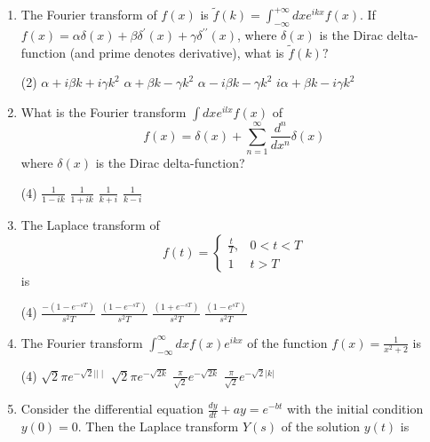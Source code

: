 \begin{enumerate}[label=\color{ocre}\textbf{\arabic*.}]
	\item  The Fourier transform of $f(x)$ is $\tilde{f}(k)=\int_{-\infty}^{+\infty} d x e^{i k x} f(x)$.
	If $f(x)=\alpha \delta(x)+\beta \delta^{\prime}(x)+\gamma \delta^{\prime \prime}(x)$, where $\delta(x)$ is the Dirac delta-function (and prime denotes derivative), what is $\tilde{f}(k) ?$
	{}
	\begin{tasks}(2)
		\task[\textbf{A.}] $\alpha+i \beta k+i \gamma k^{2}$
		\task[\textbf{B.}] $\alpha+\beta k-\gamma k^{2}$
		\task[\textbf{C.}]  $\alpha-i \beta k-\gamma k^{2}$
		\task[\textbf{D.}] $i \alpha+\beta k-i \gamma k^{2}$
	\end{tasks}
	\item  What is the Fourier transform $\int d x e^{i l x} f(x)$ of
	$$
	f(x)=\delta(x)+\sum_{n=1}^{\infty} \frac{d^{n}}{d x^{n}} \delta(x)
	$$
	where $\delta(x)$ is the Dirac delta-function?
	{}
	\begin{tasks}(4)
		\task[\textbf{A.}]  $\frac{1}{1-i k}$
		\task[\textbf{B.}] $\frac{1}{1+i k}$
		\task[\textbf{C.}] $\frac{1}{k+i}$
		\task[\textbf{D.}] $\frac{1}{k-i}$
	\end{tasks}
	\item The Laplace transform of
	$$
	f(t)=\left\{\begin{array}{cc}
	\frac{t}{T}, & 0<t<T \\
	1 & t>T
	\end{array}\right.
	$$
	is
	{}
	\begin{tasks}(4)
		\task[\textbf{A.}] $\frac{-\left(1-e^{-s T}\right)}{s^{2} T}$
		\task[\textbf{B.}] $\frac{\left(1-e^{-s T}\right)}{s^{2} T}$
		\task[\textbf{C.}] $\frac{\left(1+e^{-s T}\right)}{s^{2} T}$
		\task[\textbf{D.}] $\frac{\left(1-e^{s T}\right)}{s^{2} T}$
	\end{tasks}
	\item The Fourier transform $\int_{-\infty}^{\infty} d x f(x) e^{i k x}$ of the function $f(x)=\frac{1}{x^{2}+2}$ is
	{}
	\begin{tasks}(4)
		\task[\textbf{A.}] $\sqrt{2} \pi e^{-\sqrt{2}|| \mid}$
		\task[\textbf{B.}] $\sqrt{2} \pi e^{-\sqrt{2 k}}$
		\task[\textbf{C.}] $\frac{\pi}{\sqrt{2}} e^{-\sqrt{2 k}}$
		\task[\textbf{D.}] $\frac{\pi}{\sqrt{2}} e^{-\sqrt{2}|k|}$
	\end{tasks}
	\item Consider the differential equation $\frac{d y}{d t}+a y=e^{-b t}$ with the initial condition $y(0)=0$. Then the Laplace transform $Y(s)$ of the solution $y(t)$ is

\end{enumerate}
